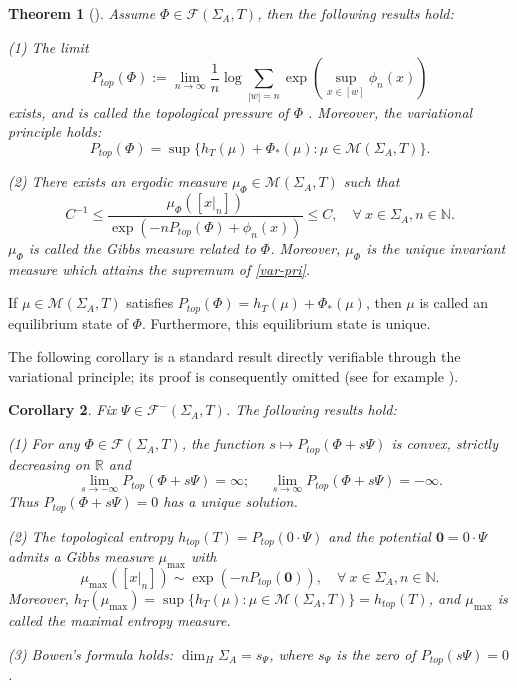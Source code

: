 \documentclass[reqno,11pt,graphicx,]{amsart}
\numberwithin{equation}{section}
\theoremstyle{plain}
\newcommand{\N}{{\mathbb N}}
\newcommand{\R}{{\mathbb R}}
\newcommand{\3}{\mathbf{3}}
\newcommand{\mw}{x}
\newtheorem{theorem}{Theorem}[section]
\newtheorem{corollary}[theorem]{Corollary}
\begin{document}
	\begin{theorem}[\cite{Ba2006,Mu2006}]\label{variation priciple}
		Assume $\Phi\in\mathcal{F}(\Sigma_A,T)$, then the following results hold:
		
		(1) The limit
		\begin{equation*}\label{def-pre}
			P_{top}(\Phi):=\lim\limits_{n\to\infty}\frac{1}{n}\log\sum_{|w|=n}\exp(\sup_{x\in[w]}\phi_n(x))
		\end{equation*}
		exists, and is called the topological pressure of $\Phi$%
		. Moreover, the variational principle holds:
		\begin{equation}\label{var-pri}
			P_{top}(\Phi)=\sup\{h_{T}(\mu)+\Phi_*(\mu):\mu\in\mathcal{M}(\Sigma_A,T)\}.
		\end{equation}
		
		(2) There exists an ergodic measure $\mu_{\Phi}\in\mathcal{M}(\Sigma_A,T)$ such that
		\begin{equation*}
			C^{-1}\leq\frac{\mu_{\Phi}([x|_n])}{\exp(-nP_{top}(\Phi)+\phi_n(x))}\leq C,\quad\forall\ x\in\Sigma_A,n\in\N.
		\end{equation*}
		$\mu_{\Phi}$ is called the Gibbs measure related to $\Phi$. Moreover, $\mu_{\Phi}$ is the unique invariant measure which attains the supremum of \eqref{var-pri}.
	\end{theorem}
	If $\mu\in\mathcal{M}(\Sigma_A,T)$ satisfies $P_{top}(\Phi)=h_{T}(\mu)+\Phi_*(\mu)$, then $\mu$ is called an equilibrium state of $\Phi$. Furthermore, this equilibrium state is unique. 
	
	The following corollary is a standard result directly verifiable through the variational principle; its proof is consequently omitted (see for example \cite{Ba1996}).
	\begin{corollary}\label{pressure-continuous}
		Fix $\Psi\in\mathcal{F}^-(\Sigma_{A},T)$. The following results hold:
		
		(1) For any $\Phi\in\mathcal{F}(\Sigma_{A},T)$, the function $s\mapsto P_{top}(\Phi+s\Psi)$ is convex, strictly decreasing on $\R$ and
		\begin{equation*}
			\lim\limits_{s\to-\infty}P_{top}(\Phi+s\Psi)=\infty;\ \ \  \ \ \ \lim\limits_{s\to\infty}P_{top}(\Phi+s\Psi)=-\infty.
		\end{equation*}
		Thus $P_{top}(\Phi+s\Psi)=0$ has a unique solution.
		
		(2) The topological entropy $h_{top}(T)=P_{top}(0\cdot\Psi)$ and the potential $\mathbf{0}=0\cdot\Psi$ admits a Gibbs measure $\mu_{\max}$ with $$\mu_{\max}([\mw|_n])\sim\exp(-nP_{top}(\mathbf{0})),\quad\forall\ x\in\Sigma_{A},n\in\N.$$
		Moreover, $h_{T}(\mu_{\max})=\sup\{h_{T}(\mu):\mu\in\mathcal{M}(\Sigma_A,T)\}=h_{top}(T)$, and $\mu_{\max}$ is called the maximal entropy measure.
		
		(3) Bowen's formula holds: $\dim_H\Sigma_A=s_{\Psi}$, where $s_{\Psi}$ is the zero of $P_{top}(s\Psi)=0$.
	\end{corollary}
\end{document}
